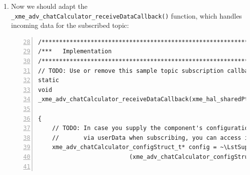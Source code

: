 \begin{enumerate}
\begin{lstlisting}[numbers=left,firstnumber=69]
xme_core_status_t
xme_adv_chatCalculator_create(xme_adv_chatCalculator_configStruct_t* config)
{
	// TODO: Initialize component state
/*	config->dummyState = 0; */               /~~/ Comment or remove this line

/*	// TODO: Add code */                    /~~/ Comment or remove this block
//	XME_LOG(XME_LOG_NOTE, "Create function of Chat Calculator called!\n");

	// Example: Publish a topic
	config->publicationHandle =
		xme_core_dcc_publishTopic
		(
			config->topic,                              /~~/ Change this line
			XME_CORE_MD_EMPTY_META_DATA,
			false,
			NULL
		);

	// Check for errors
	if (XME_CORE_DCC_INVALID_PUBLICATION_HANDLE == ~\LstSuppressNumber~
		                                         config->publicationHandle) ~\LstReactivateNumber~
	{
		return XME_CORE_STATUS_INTERNAL_ERROR;
	}

	// Example: Subscribe to a topic
	config->subscriptionHandle =
		xme_core_dcc_subscribeTopic
		(
			config->topic,                              /~~/ Change this line
			XME_CORE_MD_EMPTY_META_DATA,
			false,
			_xme_adv_chatCalculator_receiveDataCallback,
			config
		); ~\LstSuppressNumber~

	[...]                           /~~/ Leave the rest of the function as-is
} ~\LstReactivateNumber~
\end{lstlisting}

	\item Now we should adapt the \verb|_xme_adv_chatCalculator_receiveDataCallback()| function,
		which handles incoming data for the subscribed topic:

\begin{lstlisting}[numbers=left,firstnumber=28]
/*************************************************************************/
/***   Implementation                                                  ***/
/*************************************************************************/
// TODO: Use or remove this sample topic subscription callback function:
static
void
_xme_adv_chatCalculator_receiveDataCallback(xme_hal_sharedPtr_t dataHandle, ~\LstSuppressNumber~
                                                            void* userData) ~\LstReactivateNumber~
{
	// TODO: In case you supply the component's configuration instance
	//       via userData when subscribing, you can access it here:
	xme_adv_chatCalculator_configStruct_t* config = ~\LstSuppressNumber~
                          (xme_adv_chatCalculator_configStruct_t*)userData; ~\LstReactivateNumber~


\end{lstlisting}
\end{enumerate}
